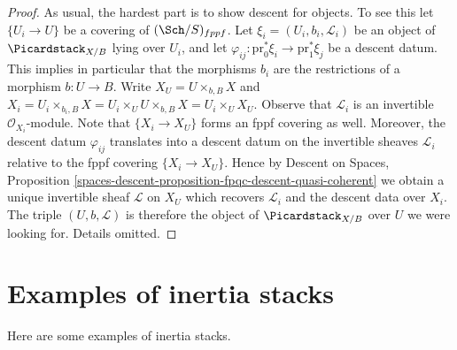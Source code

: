 \begin{proof}
As usual, the hardest part is to show descent for objects.
To see this let $\{U_i \to U\}$ be a covering of $(\Sch/S)_{fppf}$.
Let $\xi_i = (U_i, b_i, \mathcal{L}_i)$ be an object of
$\Picardstack_{X/B}$ lying over $U_i$, and let
$\varphi_{ij} : \text{pr}_0^*\xi_i \to \text{pr}_1^*\xi_j$
be a descent datum. This implies in particular that the morphisms
$b_i$ are the restrictions of a morphism $b : U \to B$.
Write $X_U = U \times_{b, B} X$ and
$X_i = U_i \times_{b_i, B} X =
U_i \times_U U \times_{b, B} X = U_i \times_U X_U$.
Observe that $\mathcal{L}_i$ is an invertible $\mathcal{O}_{X_i}$-module.
Note that $\{X_i \to X_U\}$ forms an fppf covering as well.
Moreover, the descent datum $\varphi_{ij}$ translates into a
descent datum on the invertible sheaves $\mathcal{L}_i$ relative
to the fppf covering $\{X_i \to X_U\}$.
Hence by
Descent on Spaces,
Proposition \ref{spaces-descent-proposition-fpqc-descent-quasi-coherent}
we obtain a unique invertible sheaf $\mathcal{L}$ on $X_U$
which recovers $\mathcal{L}_i$ and the descent data over $X_i$.
The triple $(U, b, \mathcal{L})$ is therefore the object of
$\Picardstack_{X/B}$ over $U$ we were looking for.
Details omitted.
\end{proof}

\section{Examples of inertia stacks}
\label{examples-stacks-section-examples-inertia}
Here are some examples of inertia stacks.

